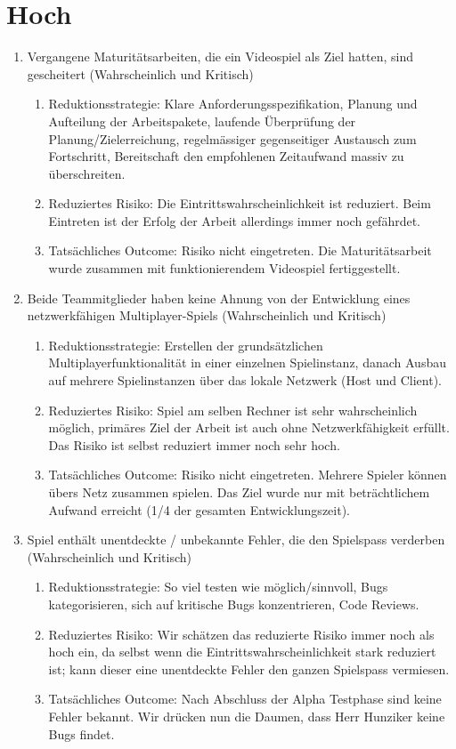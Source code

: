 \section{Hoch}
\begin{enumerate}
    \item Vergangene Maturitätsarbeiten, die ein Videospiel als Ziel hatten, sind gescheitert (Wahrscheinlich und Kritisch)
    \begin{enumerate}
        \item Reduktionsstrategie: Klare Anforderungsspezifikation, Planung und Aufteilung der Arbeitspakete, laufende Überprüfung der Planung/Zielerreichung, regelmässiger gegenseitiger Austausch zum Fortschritt,
        Bereitschaft den empfohlenen Zeitaufwand massiv zu überschreiten.
        \item Reduziertes Risiko: Die Eintrittswahrscheinlichkeit ist reduziert. Beim Eintreten ist der Erfolg der Arbeit allerdings immer noch gefährdet.
        \item Tatsächliches Outcome: Risiko nicht eingetreten. Die Maturitätsarbeit wurde zusammen mit funktionierendem Videospiel fertiggestellt.
    \end{enumerate}

    \item Beide Teammitglieder haben keine Ahnung von der Entwicklung eines netzwerkfähigen Multiplayer-Spiels (Wahrscheinlich und Kritisch)
    \begin{enumerate}
        \item Reduktionsstrategie: Erstellen der grundsätzlichen Multiplayerfunktionalität in einer einzelnen Spielinstanz, danach Ausbau auf mehrere Spielinstanzen über das lokale Netzwerk (\gls{Host} und \gls{Client}).
        \item Reduziertes Risiko: Spiel am selben Rechner ist sehr wahrscheinlich möglich, primäres Ziel der Arbeit ist auch ohne Netzwerkfähigkeit erfüllt. Das Risiko ist selbst reduziert immer noch sehr hoch. 
        \item Tatsächliches Outcome: Risiko nicht eingetreten. Mehrere Spieler können übers Netz zusammen spielen. Das Ziel wurde nur mit beträchtlichem Aufwand erreicht (1/4 der gesamten Entwicklungszeit).
    \end{enumerate}

    \item Spiel enthält unentdeckte / unbekannte Fehler, die den Spielspass verderben (Wahrscheinlich und Kritisch)
    \begin{enumerate}
        \item Reduktionsstrategie: So viel testen wie möglich/sinnvoll, Bugs kategorisieren, sich auf kritische Bugs konzentrieren, Code Reviews.
        \item Reduziertes Risiko: Wir schätzen das reduzierte Risiko immer noch als hoch ein, da selbst wenn die Eintrittswahrscheinlichkeit stark reduziert ist; kann dieser eine unentdeckte Fehler den ganzen Spielspass vermiesen.
        \item Tatsächliches Outcome: Nach Abschluss der Alpha Testphase sind keine Fehler bekannt. Wir drücken nun die Daumen, dass Herr Hunziker keine Bugs findet.
    \end{enumerate}


\end{enumerate}
